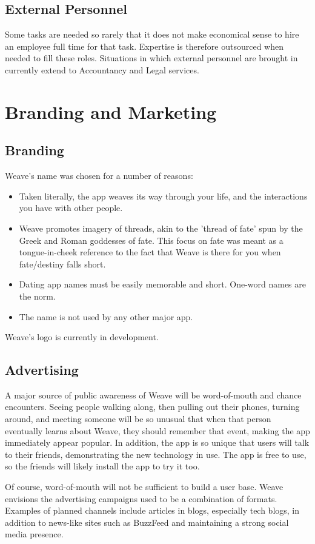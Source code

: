 \documentclass[12pt, a4paper]{article}
\newenvironment{main}
{\begin{spacing}{1.2}\setlength{\parskip}{0.5\baselineskip}}
{\end{spacing}\setlength{\parskip}{0pt}}
\begin{document}
\begin{main}
\subsection{External Personnel}
Some tasks are needed so rarely that it does not make economical sense to hire an employee full time for that task. Expertise is therefore outsourced when needed to fill these roles. Situations in which external personnel are brought in currently extend to Accountancy and Legal services.

\section{Branding and Marketing}
\subsection{Branding}
Weave's name was chosen for a number of reasons:
\begin{itemize}
	\item Taken literally, the app weaves its way through your life, and the interactions you have with other people.
	\item Weave promotes imagery of threads, akin to the 'thread of fate' spun by the Greek and Roman goddesses of fate. This focus on fate was meant as a tongue-in-cheek reference to the fact that Weave is there for you when fate/destiny falls short.
	\item Dating app names must be easily memorable and short. One-word names are the norm.
	\item The name is not used by any other major app.
\end{itemize}
Weave's logo is currently in development.

\subsection{Advertising}
A major source of public awareness of Weave will be word-of-mouth and chance encounters. Seeing people walking along, then pulling out their phones, turning around, and meeting someone will be so unusual that when that person eventually learns about Weave, they should remember that event, making the app immediately appear popular. In addition, the app is so unique that users will talk to their friends, demonstrating the new technology in use. The app is free to use, so the friends will likely install the app to try it too.

Of course, word-of-mouth will not be sufficient to build a user base. Weave envisions the advertising campaigns used to be a combination of formats. Examples of planned channels include articles in blogs, especially tech blogs, in addition to news-like sites such as BuzzFeed and maintaining a strong social media presence. 


\end{main}
\end{document}
